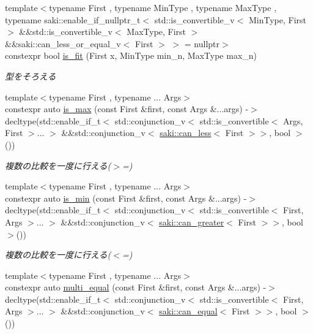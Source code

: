 \begin{DoxyCompactItemize}
{\footnotesize template$<$typename First , typename Min\+Type , typename Max\+Type , typename saki\+::enable\+\_\+if\+\_\+nullptr\+\_\+t$<$ std\+::is\+\_\+convertible\+\_\+v$<$ Min\+Type, First $>$ \&\&std\+::is\+\_\+convertible\+\_\+v$<$ Max\+Type, First $>$ \&\&saki\+::can\+\_\+less\+\_\+or\+\_\+equal\+\_\+v$<$ First $>$ $>$  = nullptr$>$ }\\constexpr bool \mbox{\hyperlink{namespacesaki_a09478d8cb01d75e93d34f884d7133dc9}{is\+\_\+fit}} (First x, Min\+Type min\+\_\+n, Max\+Type max\+\_\+n)
\begin{DoxyCompactList}\small\item\em 型をそろえる \end{DoxyCompactList}\item 
{\footnotesize template$<$typename First , typename ... Args$>$ }\\constexpr auto \mbox{\hyperlink{namespacesaki_a0fe50c96fb27e8f05d202e4635b582a2}{is\+\_\+max}} (const First \&first, const Args \&...args) -\/$>$ decltype(std\+::enable\+\_\+if\+\_\+t$<$ std\+::conjunction\+\_\+v$<$ std\+::is\+\_\+convertible$<$ Args, First $>$... $>$ \&\&std\+::conjunction\+\_\+v$<$ \mbox{\hyperlink{structsaki_1_1can__less}{saki\+::can\+\_\+less}}$<$ First $>$$>$, bool $>$())
\begin{DoxyCompactList}\small\item\em 複数の比較を一度に行える($>$=) \end{DoxyCompactList}\item 
{\footnotesize template$<$typename First , typename ... Args$>$ }\\constexpr auto \mbox{\hyperlink{namespacesaki_a223be67dabf8c1215122d80d0cc811c4}{is\+\_\+min}} (const First \&first, const Args \&...args) -\/$>$ decltype(std\+::enable\+\_\+if\+\_\+t$<$ std\+::conjunction\+\_\+v$<$ std\+::is\+\_\+convertible$<$ First, Args $>$... $>$ \&\&std\+::conjunction\+\_\+v$<$ \mbox{\hyperlink{structsaki_1_1can__greater}{saki\+::can\+\_\+greater}}$<$ First $>$$>$, bool $>$())
\begin{DoxyCompactList}\small\item\em 複数の比較を一度に行える($<$=) \end{DoxyCompactList}\item 
{\footnotesize template$<$typename First , typename ... Args$>$ }\\constexpr auto \mbox{\hyperlink{namespacesaki_a9f7f1252e3ed939885a3b4c4b09943b8}{multi\+\_\+equal}} (const First \&first, const Args \&...args) -\/$>$ decltype(std\+::enable\+\_\+if\+\_\+t$<$ std\+::conjunction\+\_\+v$<$ std\+::is\+\_\+convertible$<$ First, Args $>$... $>$ \&\&std\+::conjunction\+\_\+v$<$ \mbox{\hyperlink{structsaki_1_1can__equal}{saki\+::can\+\_\+equal}}$<$ First $>$$>$, bool $>$())
$$
\end{DoxyCompactItemize}
